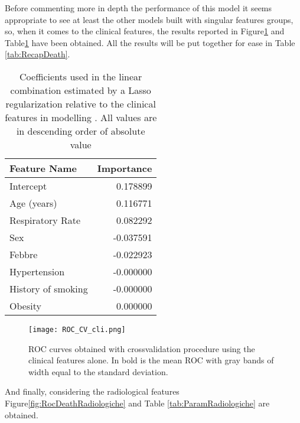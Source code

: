 Before commenting more in depth the performance of this model it seems appropriate to see at least the other models built with singular features groups, so, when it comes to the clinical features, the results reported in Figure\ref{fig:RocDeathCli} and Table\ref{tab:ParamCli} have been obtained. All the results will be put together for ease in Table \ref{tab:RecapDeath}.

\begin{table}
\caption{Coefficients used in the linear combination estimated by a Lasso regularization relative to the clinical features in modelling \death. All values are in descending order of absolute value\label{tab:ParamCli}}
\centering
	\begin{tabular}{lr}
		\toprule
		Feature Name &   Importance \\
		\midrule
		Intercept          &                      0.178899 \\
		Age (years)        &                      0.116771 \\
		Respiratory Rate   &                      0.082292 \\
		Sex           &                     -0.037591 \\
		Febbre             &                     -0.022923 \\
		Hypertension       &                     -0.000000 \\
		History of smoking &                     -0.000000 \\
		Obesity            &                      0.000000 \\
		\bottomrule
	\end{tabular}
\end{table}

\begin{figure}[htbp]
	\centering
  		\texttt{[image: ROC\_CV\_cli.png]}
        \caption{ROC curves obtained with crossvalidation procedure using the clinical features alone. In bold is the mean ROC with gray bands of width equal to the standard deviation.\label{fig:RocDeathCli}}
\end{figure}

And finally, considering the radiological features Figure\ref{fig:RocDeathRadiologiche} and Table \ref{tab:ParamRadiologiche} are obtained.

